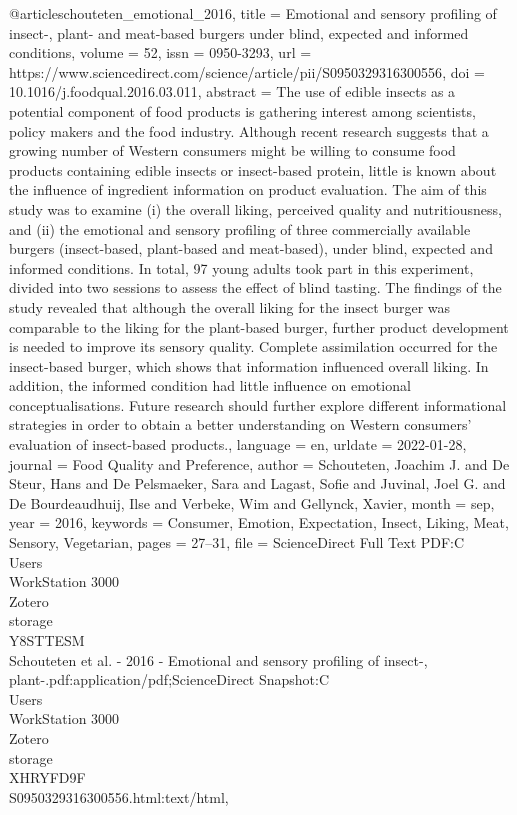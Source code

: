 @article{schouteten_emotional_2016,
	title = {Emotional and sensory profiling of insect-, plant- and meat-based burgers under blind, expected and informed conditions},
	volume = {52},
	issn = {0950-3293},
	url = {https://www.sciencedirect.com/science/article/pii/S0950329316300556},
	doi = {10.1016/j.foodqual.2016.03.011},
	abstract = {The use of edible insects as a potential component of food products is gathering interest among scientists, policy makers and the food industry. Although recent research suggests that a growing number of Western consumers might be willing to consume food products containing edible insects or insect-based protein, little is known about the influence of ingredient information on product evaluation. The aim of this study was to examine (i) the overall liking, perceived quality and nutritiousness, and (ii) the emotional and sensory profiling of three commercially available burgers (insect-based, plant-based and meat-based), under blind, expected and informed conditions. In total, 97 young adults took part in this experiment, divided into two sessions to assess the effect of blind tasting. The findings of the study revealed that although the overall liking for the insect burger was comparable to the liking for the plant-based burger, further product development is needed to improve its sensory quality. Complete assimilation occurred for the insect-based burger, which shows that information influenced overall liking. In addition, the informed condition had little influence on emotional conceptualisations. Future research should further explore different informational strategies in order to obtain a better understanding on Western consumers’ evaluation of insect-based products.},
	language = {en},
	urldate = {2022-01-28},
	journal = {Food Quality and Preference},
	author = {Schouteten, Joachim J. and De Steur, Hans and De Pelsmaeker, Sara and Lagast, Sofie and Juvinal, Joel G. and De Bourdeaudhuij, Ilse and Verbeke, Wim and Gellynck, Xavier},
	month = sep,
	year = {2016},
	keywords = {Consumer, Emotion, Expectation, Insect, Liking, Meat, Sensory, Vegetarian},
	pages = {27--31},
	file = {ScienceDirect Full Text PDF:C\:\\Users\\WorkStation 3000\\Zotero\\storage\\Y8STTESM\\Schouteten et al. - 2016 - Emotional and sensory profiling of insect-, plant-.pdf:application/pdf;ScienceDirect Snapshot:C\:\\Users\\WorkStation 3000\\Zotero\\storage\\XHRYFD9F\\S0950329316300556.html:text/html},
}

